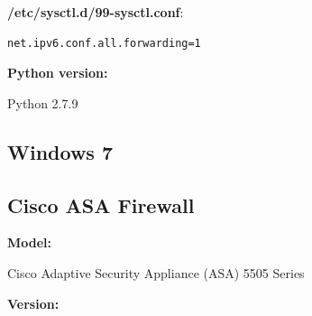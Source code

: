\documentclass[12pt]{article}
\begin{document}
\textbf{/etc/sysctl.d/99-sysctl.conf}:

\vspace{-5pt}
\begin{lstlisting}[style=python,basicstyle=\ttfamily\scriptsize]
 net.ipv6.conf.all.forwarding=1
\end{lstlisting}

\textbf{Python version:} 

\vspace{-15pt}
Python 2.7.9

\subsection{Windows 7}

\subsection{Cisco ASA Firewall}

\textbf{Model:} 

\vspace{-15pt}
Cisco Adaptive Security Appliance (ASA) 5505 Series

\textbf{Version:}
\end{document}
